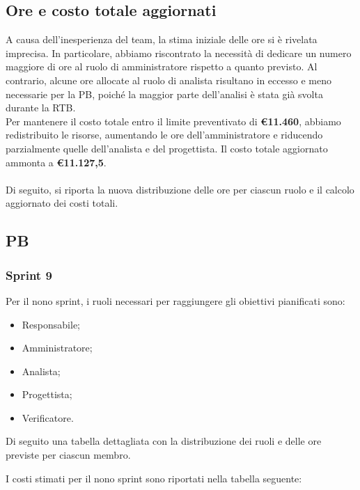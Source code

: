 \subsection{Ore e costo totale aggiornati}  
A causa dell’inesperienza del team, la stima iniziale delle ore si è rivelata imprecisa. In particolare, abbiamo riscontrato la necessità di dedicare un numero maggiore di ore al ruolo di amministratore rispetto a quanto previsto. Al contrario, alcune ore allocate al ruolo di analista risultano in eccesso e meno necessarie per la PB, poiché la maggior parte dell'analisi è stata già svolta durante la RTB.\\  
Per mantenere il costo totale entro il limite preventivato di \textbf{\euro 11.460}, abbiamo redistribuito le risorse, aumentando le ore dell’amministratore e riducendo parzialmente quelle dell’analista e del progettista. Il costo totale aggiornato ammonta a \textbf{\euro 11.127,5}.  
\\\\
Di seguito, si riporta la nuova distribuzione delle ore per ciascun ruolo e il calcolo aggiornato dei costi totali.




\pagebreak
\subsection{PB}

\subsubsection{Sprint 9}
Per il nono sprint, i ruoli necessari per raggiungere gli obiettivi
pianificati sono:
\begin{itemize}
    \item Responsabile;
    \item Amministratore;
    \item Analista;
    \item Progettista;
    \item Verificatore.
\end{itemize}

Di seguito una tabella dettagliata con la distribuzione dei ruoli e delle ore previste per ciascun membro.



I costi stimati per il nono sprint sono riportati nella tabella seguente:

